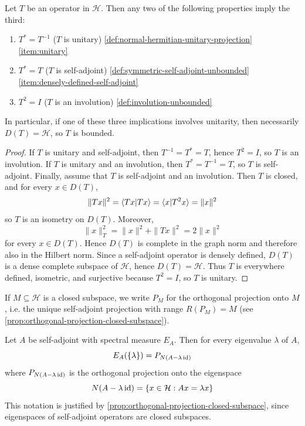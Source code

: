 \begin{theorem}\label{thm:unitary-selfadjoint-involution}
Let $T$ be an operator in $\mathcal H$. Then any two of the following properties imply the third:
\begin{enumerate}[label=(\alph*)]
  \item $T^* = T^{-1}$ ($T$ is unitary) \hfill {} \autoref{def:normal-hermitian-unitary-projection} \ref{item:unitary}
  \item $T^* = T$ ($T$ is self-adjoint) \hfill {} \autoref{def:symmetric-self-adjoint-unbounded} \ref{item:densely-defined-self-adjoint}
  \item $T^2 = I$ ($T$ is an involution) \hfill {} \autoref{def:involution-unbounded}
\end{enumerate}
In particular, if one of these three implications involves unitarity, then necessarily $D(T)=\mathcal H$, so $T$ is bounded.
\end{theorem}

\begin{proof}
If $T$ is unitary and self-adjoint, then $T^{-1}=T^*=T$, hence $T^2=I$, so $T$ is an involution.
If $T$ is unitary and an involution, then $T^*=T^{-1}=T$, so $T$ is self-adjoint.
Finally, assume that $T$ is self-adjoint and an involution.
Then $T$ is closed, and for every $x\in D(T)$,
\[
\|Tx\|^2 = \braket{Tx|Tx} = \braket{x|T^2x} = \|x\|^2
\]
so $T$ is an isometry on $D(T)$.
Moreover,
\[
\|x\|_T^2 = \|x\|^2+\|Tx\|^2 = 2\|x\|^2
\]
for every $x \in D(T)$.
Hence $D(T)$ is complete in the graph norm and therefore also in the Hilbert norm.
Since a self-adjoint operator is densely defined, $D(T)$ is a dense complete subspace of $\mathcal H$, hence $D(T)=\mathcal H$.
Thus $T$ is everywhere defined, isometric, and surjective because $T^2=I$, so $T$ is unitary.
\end{proof}


\begin{notation}
If \(M \subseteq \mathcal H\) is a closed subspace, we write \(P_M\) for the orthogonal projection onto \(M\), i.e. the unique self-adjoint projection with range \(R(P_M)=M\) (see \autoref{prop:orthogonal-projection-closed-subspace}).
\end{notation}

\begin{proposition}\label{prop:spectral-projection-eigenspace}
Let \(A\) be self-adjoint with spectral measure \(E_A\). Then for every eigenvalue \(\lambda\) of \(A\),
\[
E_A(\{\lambda\}) = P_{N(A-\lambda \operatorname{id})}
\]
where \(P_{N(A-\lambda \operatorname{id})}\) is the orthogonal projection onto the eigenspace
\[
N(A-\lambda \operatorname{id})=\{x\in\mathcal H:Ax=\lambda x\}
\]
This notation is justified by \autoref{prop:orthogonal-projection-closed-subspace}, since eigenspaces of self-adjoint operators are closed subspaces.
\end{proposition}


